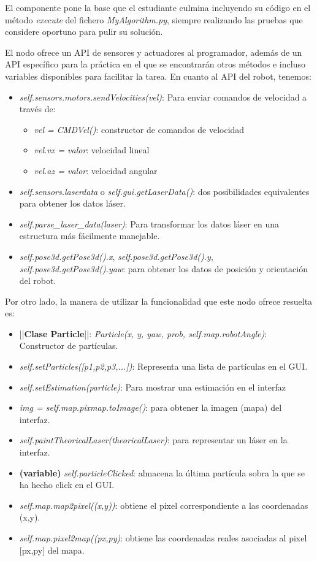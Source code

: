 El componente pone la base que el estudiante culmina incluyendo su código en el método \textit{execute} del fichero \textit{MyAlgorithm.py}, siempre realizando las pruebas que considere oportuno para pulir su solución.

El nodo ofrece un API de sensores y actuadores al programador, además de un API específico para la práctica en el que se encontrarán otros métodos e incluso variables disponibles para facilitar la tarea. En cuanto al API del robot, tenemos:

\begin{itemize}
	\item \textit{self.sensors.motors.sendVelocities(vel)}: Para enviar comandos de velocidad a través de:
    \begin{itemize}[label={$\diamond$}]
			\item \textit{vel = CMDVel()}: constructor de comandos de velocidad
       \item \textit{vel.vx = valor}: velocidad lineal
       \item \textit{vel.az = valor}: velocidad angular
    \end{itemize}
    \item \textit{self.sensors.laserdata} o \textit{self.gui.getLaserData()}: dos posibilidades equivalentes para obtener los datos láser.
    \item \textit{self.parse\_laser\_data(laser)}: Para transformar los datos láser en una estructura más fácilmente manejable.
		\item \textit{self.pose3d.getPose3d().x}, \textit{self.pose3d.getPose3d().y}, \textit{self.pose3d.getPose3d().yaw}: para obtener los datos de posición y orientación del robot.
\end{itemize}

Por otro lado, la manera de utilizar la funcionalidad que este nodo ofrece resuelta es:

\begin{itemize}
	\item ||\textbf{Clase Particle}||: \textit{Particle(x, y, yaw, prob, self.map.robotAngle)}: Constructor de partículas.
	\item \textit{self.setParticles([p1,p2,p3,...])}: Representa una lista de partículas en el GUI.
	\item \textit{self.setEstimation(particle)}: Para mostrar una estimación en el interfaz
	\item \textit{img = self.map.pixmap.toImage()}: para obtener la imagen (mapa) del interfaz.
	\item \textit{self.paintTheoricalLaser(theoricalLaser)}: para representar un láser en la interfaz.
	\item \textbf{(variable)} \textit{self.particleClicked}: almacena la última partícula sobra la que se ha hecho click en el GUI. 
	\item \textit{self.map.map2pixel((x,y))}: obtiene el pixel correspondiente a las coordenadas (x,y).
	\item \textit{self.map.pixel2map((px,py)}: obtiene las coordenadas reales asociadas al pixel [px,py] del mapa.
\end{itemize}

